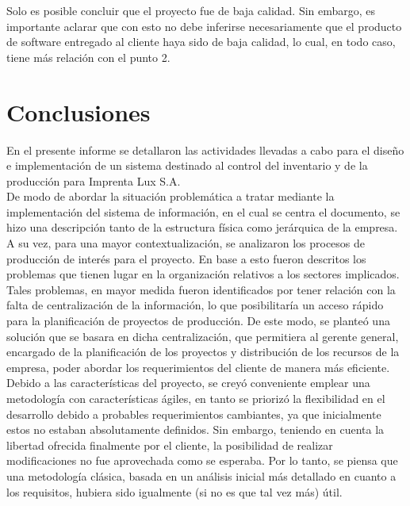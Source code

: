 \documentclass[a4paper, 12pt,twoside]{report}  %
\numberwithin{equation}{subsection} %
\begin{document}
Solo es posible concluir que el proyecto fue de baja calidad. Sin embargo, es importante aclarar que con esto no debe inferirse necesariamente que el producto de software entregado al cliente haya sido de baja calidad, lo cual, en todo caso, tiene más relación con el punto 2.

\chapter{Conclusiones}
\indent En el presente informe se detallaron las actividades llevadas a cabo para el diseño e implementación de un sistema destinado al control del inventario y de la producción para Imprenta Lux S.A.\\
\indent De modo de abordar la situación problemática a tratar mediante la implementación del sistema de información, en el cual se centra el documento, se hizo una descripción tanto de la estructura física como jerárquica de la empresa. A su vez, para una mayor contextualización, se analizaron los procesos de producción de interés para el proyecto. En base a esto fueron descritos los problemas que tienen lugar en la organización relativos a los sectores implicados. Tales problemas, en mayor medida fueron identificados por tener relación con la falta de centralización de la información, lo que posibilitaría un acceso rápido para la planificación de proyectos de producción. De este modo, se planteó una solución que se basara en dicha centralización, que permitiera al gerente general, encargado de la planificación de los proyectos y distribución de los recursos de la empresa, poder abordar los requerimientos del cliente de manera más eficiente.\\
\indent Debido a las características del proyecto, se creyó conveniente emplear una metodología con características ágiles, en tanto se priorizó la flexibilidad en el desarrollo debido a probables requerimientos cambiantes, ya que inicialmente estos no estaban absolutamente definidos. Sin embargo, teniendo en cuenta la libertad ofrecida finalmente por el cliente, la posibilidad de realizar modificaciones no fue aprovechada como se esperaba. Por lo tanto, se piensa que una metodología clásica, basada en un análisis inicial más detallado en cuanto a los requisitos, hubiera sido igualmente (si no es que tal vez más) útil.\\
\end{document}
